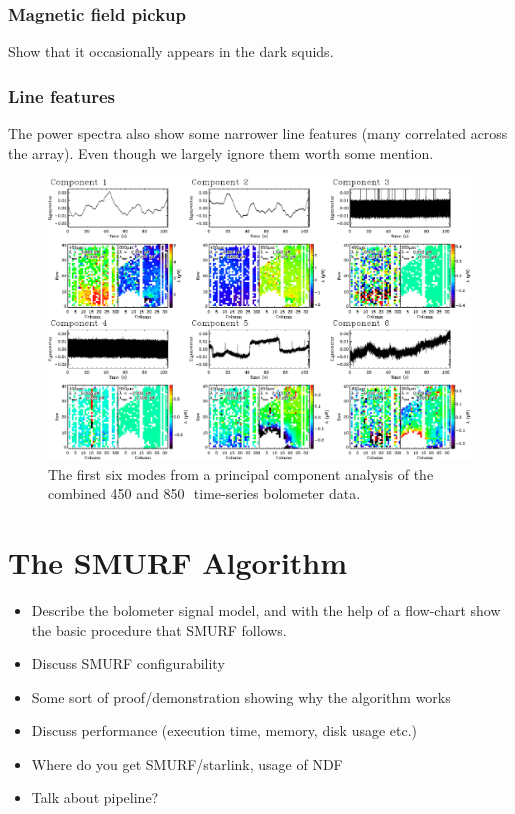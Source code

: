 \documentclass[useAMS,usenatbib,nofootinbib]{mn2e}
\begin{document}
\subsubsection{Magnetic field pickup}
Show that it occasionally appears in the dark squids.

\subsubsection{Line features}

The power spectra also show some narrower line features (many
correlated across the array). Even though we largely ignore them worth
some mention.

\begin{figure}
\centering
\includegraphics[width=\linewidth]{pca.pdf}
\caption{The first six modes from a principal component analysis of
  the combined 450 and 850\,\micron\ time-series bolometer data.}
\label{fig:pca}
\end{figure}

\section{The SMURF Algorithm}
\label{sec:algorithm}

\begin{itemize}

\item Describe the bolometer signal model, and with the help of a flow-chart
show the basic procedure that SMURF follows.

\item Discuss SMURF configurability

\item Some sort of proof/demonstration showing why the algorithm works

\item Discuss performance (execution time, memory, disk usage etc.)

\item Where do you get SMURF/starlink, usage of NDF

\item Talk about pipeline?

\end{itemize}
\end{document}
